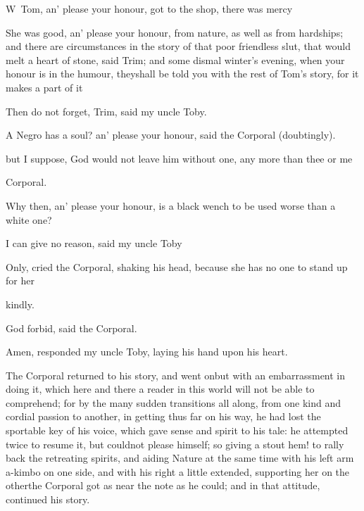 \documentclass{article}
\begin{document}
\lettrine{W}{\,} Tom, an’ please
your honour, got to the shop, there was\break
{}
mercy\tsh

\tsh She was good, an’ please your honour, from
nature, as well as from hardships; and there are circumstances in
the story of that poor friendless slut, that would melt a heart of
stone, said Trim; and some dismal winter’s evening,
when your honour is in the humour, they\pb shall be told you with the
rest of Tom’s story, for it makes a part of
it\tsh

Then do not forget, Trim, said my uncle Toby.

A Negro has a soul? an’ please your honour, said the
Corporal (doubtingly).

\noindent
{}
but I suppose, God would not leave him without
one, any more than thee or me\tsh

\noindent
{}
Corporal.

\newpage
\noindent
{}
Why then, an’
please your honour, is a black wench to be used worse than a white
one?

I can give no reason, said my uncle
Toby\tsh

\tsh Only, cried the Corporal, shaking his head,
because she has no one to stand up for her\tsh

\noindent
{}
\pb 
{}
kindly.

\tsh God forbid, said the Corporal.

Amen, responded my uncle Toby, laying his hand upon his
heart.

The Corporal returned to his story, and went on\tsh but with an embar\-rassment in
doing it, which here and there a reader in this world will not be able to
comprehend; for by the many sudden transitions all along, from one kind and cordial
passion to another, in getting thus far on his way, he had lost the sportable key of
his voice, which gave sense and spirit to his tale: he attempted twice to resume it,
but could\pb not please himself; so giving a stout hem! to rally back the retreating
spirits, and aiding Nature at the same time with his left arm a-kimbo on one side,
and with his right a little extended, supporting her on the other\tsk the Corporal got
as near the note as he could; and in that attitude, continued his story.
\end{document}
